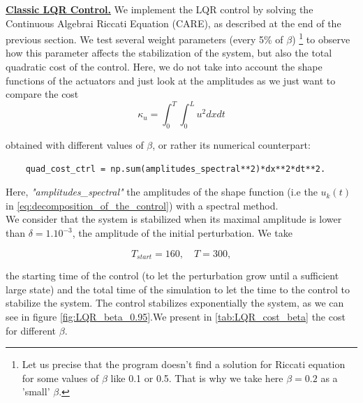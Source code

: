 \documentclass[12pt]{article}
\begin{document}
\underline{\textbf{Classic LQR Control.}} We implement the LQR control by solving the Continuous Algebrai Riccati Equation
(CARE), as described at the end of the previous section. We test several weight parameters (every 5\% of $\beta$)
\footnote{Let us precise that the program doesn't find a solution for
Riccati equation for some values of $\beta$ like 0.1 or 0.5. That is why we take here $\beta=0.2$
as a 'small' $\beta$.} to observe how this parameter affects the stabilization of the system,
but also the total quadratic cost of the control. Here, we do not take into account the shape functions
 of the actuators and just look at the amplitudes as we just want to compare the cost 
\begin{equation}
    \kappa_u = \int_{0}^{T} \int_{0}^{L}u^2 dx dt
\end{equation}

obtained with different values of $\beta$, or rather its numerical counterpart:

\begin{verbatim}
    quad_cost_ctrl = np.sum(amplitudes_spectral**2)*dx**2*dt**2.
\end{verbatim}

Here, \textit{"amplitudes\_spectral"} the amplitudes of the shape function (i.e the $u_k(t)$ in \eqref{eq:decomposition_of_the_control}) with a spectral method.
\\

We consider that the system is stabilized when its maximal amplitude is lower than $\delta=1.10^{-3}$, the 
amplitude of the initial perturbation. We take 


\begin{equation}
    T_{start} = 160, \quad T=300,
\end{equation}

the starting time of the control (to let the perturbation grow until a sufficient large state) and
the total time of the simulation to let the time to the control to stabilize the system.
The control stabilizes exponentially the system, as we can see in figure \eqref{fig:LQR_beta_0.95}.We 
present in \eqref{tab:LQR_cost_beta} the cost for different $\beta$.
\end{document}
